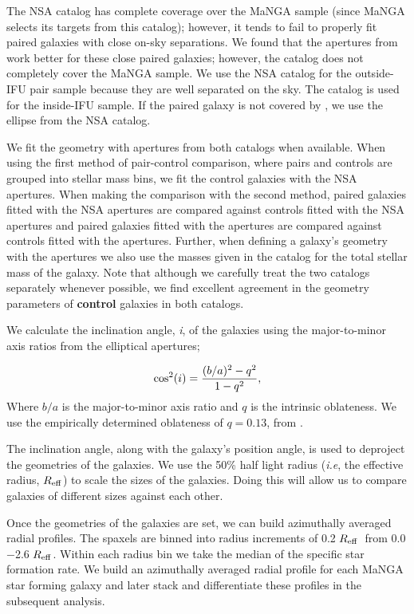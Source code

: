 \documentclass[iop,revtex4,twocolumn,apj,numberedappendix,appendixfloats]{emulateapj}
\newcommand{\reff}{$R_{\rm eff}$}
\begin{document}
The NSA catalog has complete coverage over the MaNGA sample (since MaNGA selects its targets from this catalog); however, it tends to fail to properly fit paired galaxies with close on-sky separations. We found that the apertures from \citet{Simard:2011} work better for these close paired galaxies; however, the catalog does not completely cover the MaNGA sample. We use the NSA catalog for the outside-IFU pair sample because they are well separated on the sky. The \citet{Simard:2011} catalog is used for the inside-IFU sample. If the paired galaxy is not covered by \citet{Simard:2011}, we use the ellipse from the NSA catalog. 

We fit the geometry with apertures from both catalogs when available. When using the first method of pair-control comparison, where pairs and controls are grouped into stellar mass bins, we fit the control galaxies with the NSA apertures. When making the comparison with the second method, paired galaxies fitted with the NSA apertures are compared against controls fitted with the NSA apertures and paired galaxies fitted with the \citet{Simard:2011} apertures are compared against controls fitted with the \citet{Simard:2011} apertures. Further, when defining a galaxy's geometry with the \citet{Simard:2011} apertures we also use the masses given in the catalog for the total stellar mass of the galaxy. Note that although we carefully treat the two catalogs separately whenever possible, we find excellent agreement in the geometry parameters of \textbf{control} galaxies in both catalogs.

We calculate the inclination angle, {\it i}, of the galaxies using the major-to-minor axis ratios from the elliptical apertures;

\begin{equation}
{\rm cos^2}(i) = \frac{(b/a)^2 - q^2}{1 - q^2},
\end{equation}
Where $b/a$ is the major-to-minor axis ratio and $q$ is the intrinsic oblateness. We use the empirically determined oblateness of $q = 0.13$, from \citet{Giovanelli:1994}.

The inclination angle, along with the galaxy's position angle, is used to deproject the geometries of the galaxies. We use the 50\% half light radius ({\it i.e}, the effective radius, \reff) to scale the sizes of the galaxies. Doing this will allow us to compare galaxies of different sizes against each other.

Once the geometries of the galaxies are set, we can build azimuthally averaged radial profiles. The spaxels are binned into radius increments of 0.2 \reff\ from 0.0$-$2.6 \reff. Within each radius bin we take the median of the specific star formation rate. We build an azimuthally averaged radial profile for each MaNGA star forming galaxy and later stack and differentiate these profiles in the subsequent analysis. 
\end{document}
